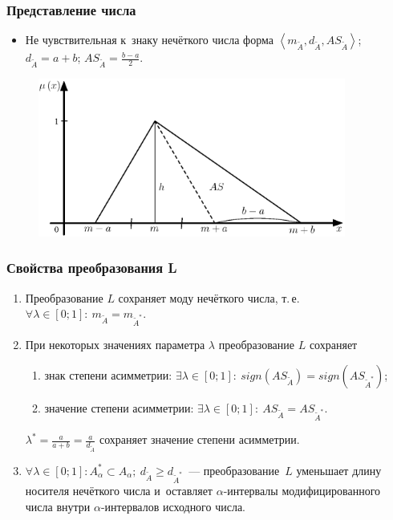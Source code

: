 \documentclass[12pt]{beamer}
\begin{document}
\begin{frame}
  \frametitle{Представление числа}
  \begin{itemize}
    \item Не чувствительная к~знаку нечёткого числа форма  $\left\langle m_{\tilde A}, d_{\tilde A}, AS_{\tilde A} \right\rangle$; $d_{\tilde A} = a+b$; $\displaystyle AS_{\tilde A} = \frac{b-a}{2}$.
  \end{itemize}
  \begin{figure}[h]
    \includegraphics[width=0.9\textwidth]{as-degree}
  \end{figure}
\end{frame}

\begin{frame}
  \frametitle{Свойства преобразования L}
  \begin{enumerate}
    \item Преобразование $L$ сохраняет моду нечёткого числа, т.\,е. $\forall \lambda \in \left[ 0;1 \right]:\ m_{\tilde A}=m_{\tilde A^{*}}$.
    \item При некоторых значениях параметра $\lambda$ преобразование $L$ сохраняет
      \begin{enumerate}
        \item знак степени асимметрии: $\exists \lambda \in [0;1]:\ sign(AS_{\tilde A})=sign(AS_{\tilde A^{*}})$;
        \item значение степени асимметрии: $\exists \lambda \in [0;1]:\ AS_{\tilde A}=AS_{\tilde A^{*}}$.
      \end{enumerate}
      $\displaystyle \lambda^* =\frac{a}{a+b}=\frac{a}{d_{\tilde A}}$ сохраняет значение степени асимметрии.
    \item $\forall \lambda \in \left[ 0;1 \right]: A_{\alpha}^{*}\subset A_\alpha;\ d_{\tilde A} \geqslant d_{\tilde A^{*}}$~--- преобразование~$L$ уменьшает длину носителя нечёткого числа и~оставляет $\alpha$-интервалы модифицированного числа внутри $\alpha$-интервалов исходного числа.
  \end{enumerate}
\end{frame}
\end{document}
